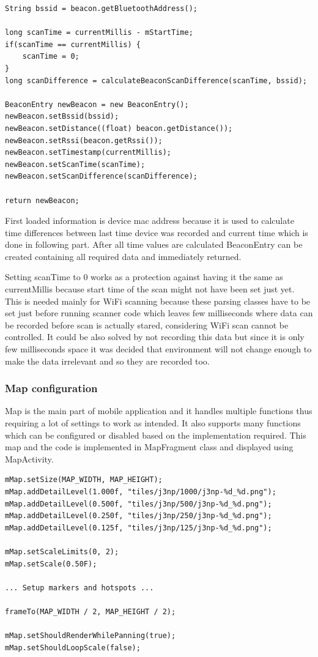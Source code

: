 \begin{lstlisting}[caption=Parsing beacon information]
String bssid = beacon.getBluetoothAddress();

long scanTime = currentMillis - mStartTime;
if(scanTime == currentMillis) {
	scanTime = 0;
}
long scanDifference = calculateBeaconScanDifference(scanTime, bssid);

BeaconEntry newBeacon = new BeaconEntry();
newBeacon.setBssid(bssid);
newBeacon.setDistance((float) beacon.getDistance());
newBeacon.setRssi(beacon.getRssi());
newBeacon.setTimestamp(currentMillis);
newBeacon.setScanTime(scanTime);
newBeacon.setScanDifference(scanDifference);

return newBeacon;
\end{lstlisting}

First loaded information is device mac address because it is used to calculate time differences between last time device was recorded and current time which is done in following part. After all time values are calculated BeaconEntry can be created containing all required data and immediately returned.

Setting scanTime to 0 works as a protection against having it the same as currentMillis because start time of the scan might not have been set just yet. This is needed mainly for WiFi scanning because these parsing classes have to be set just before running scanner code which leaves few milliseconds where data can be recorded before scan is actually stared, considering WiFi scan cannot be controlled. It could be also solved by not recording this data but since it is only few milliseconds space it was decided that environment will not change enough to make the data irrelevant and so they are recorded too.

\subsubsection{Map configuration}\label{subsubsec:MapConfiguration}
Map is the main part of mobile application and it handles multiple functions thus requiring a lot of settings to work as intended. It also supports many functions which can be configured or disabled based on the implementation required. This map and the code is implemented in MapFragment class and displayed using MapActivity.

\begin{lstlisting}[caption=Map configuration]
mMap.setSize(MAP_WIDTH, MAP_HEIGHT);
mMap.addDetailLevel(1.000f, "tiles/j3np/1000/j3np-%d_%d.png");
mMap.addDetailLevel(0.500f, "tiles/j3np/500/j3np-%d_%d.png");
mMap.addDetailLevel(0.250f, "tiles/j3np/250/j3np-%d_%d.png");
mMap.addDetailLevel(0.125f, "tiles/j3np/125/j3np-%d_%d.png");

mMap.setScaleLimits(0, 2); 
mMap.setScale(0.50F);

... Setup markers and hotspots ...

frameTo(MAP_WIDTH / 2, MAP_HEIGHT / 2);

mMap.setShouldRenderWhilePanning(true);
mMap.setShouldLoopScale(false);
\end{lstlisting}

